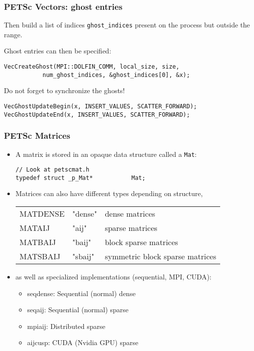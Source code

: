 \begin{frame}[fragile]
  \frametitle{PETSc Vectors: ghost entries}

Then build a list of indices \texttt{ghost\_indices} present on the process but outside the range.

\medskip
Ghost entries can then be specified:
\begin{lstlisting}[style=c]
VecCreateGhost(MPI::DOLFIN_COMM, local_size, size, 
	       num_ghost_indices, &ghost_indices[0], &x);
\end{lstlisting}

\medskip
Do not forget to synchronize the ghosts!
\begin{lstlisting}[style=c]
VecGhostUpdateBegin(x, INSERT_VALUES, SCATTER_FORWARD);
VecGhostUpdateEnd(x, INSERT_VALUES, SCATTER_FORWARD);
\end{lstlisting}

\end{frame}

\begin{frame}[fragile]
  \frametitle{PETSc Matrices}
  \begin{itemize}
  \item A matrix is stored in an opaque data structure called a \texttt{Mat}:
\begin{lstlisting}[style=c]
// Look at petscmat.h
typedef struct _p_Mat*           Mat;
\end{lstlisting}
  \item Matrices can also have different types depending on structure,
    \begin{tabular}{lll}
MATDENSE  & "dense" & dense matrices \\
MATAIJ    & "aij"   & sparse matrices \\
MATBAIJ   & "baij"  & block sparse matrices \\
MATSBAIJ  & "sbaij" & symmetric block sparse matrices
    \end{tabular}
  \item as well as specialized implementations (sequential, MPI, CUDA):
  \begin{itemize}
    \item seqdense: Sequential (normal) dense
    \item seqaij: Sequential (normal) sparse
    \item mpiaij: Distributed sparse
    \item aijcusp: CUDA (Nvidia GPU) sparse
  \end{itemize}
  \end{itemize}
\end{frame}

